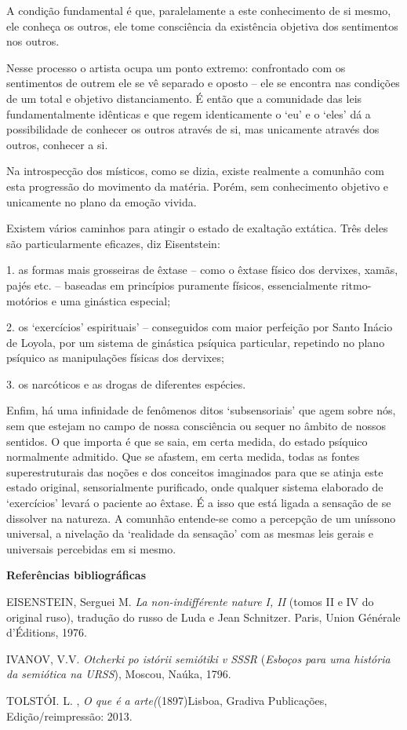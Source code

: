 A condição fundamental é que, paralelamente a este conhecimento de si
mesmo, ele conheça os outros, ele tome consciência da existência
objetiva dos sentimentos nos outros.

Nesse processo o artista ocupa um ponto extremo: confrontado com os
sentimentos de outrem ele se vê separado e oposto -- ele se encontra nas
condições de um total e objetivo distanciamento. É então que a
comunidade das leis fundamentalmente idênticas e que regem identicamente
o `eu' e o `eles' dá a possibilidade de conhecer os outros através de
si, mas unicamente através dos outros, conhecer a si.

Na introspecção dos místicos, como se dizia, existe realmente a comunhão
com esta progressão do movimento da matéria. Porém, sem conhecimento
objetivo e unicamente no plano da emoção vivida.

Existem vários caminhos para atingir o estado de exaltação extática.
Três deles são particularmente eficazes, diz Eisentstein:

1. as formas mais grosseiras de êxtase -- como o êxtase físico dos
dervixes, xamãs, pajés etc. -- baseadas em princípios puramente físicos,
essencialmente ritmo-motórios e uma ginástica especial;

2. os `exercícios' espirituais' -- conseguidos com maior perfeição por
Santo Inácio de Loyola, por um sistema de ginástica psíquica particular,
repetindo no plano psíquico as manipulações físicas dos dervixes;

3. os narcóticos e as drogas de diferentes espécies.

Enfim, há uma infinidade de fenômenos ditos `subsensoriais' que agem
sobre nós, sem que estejam no campo de nossa consciência ou sequer no
âmbito de nossos sentidos. O que importa é que se saia, em certa medida,
do estado psíquico normalmente admitido. Que se afastem, em certa
medida, todas as fontes superestruturais das noções e dos conceitos
imaginados para que se atinja este estado original, sensorialmente
purificado, onde qualquer sistema elaborado de `exercícios' levará o
paciente ao êxtase. É a isso que está ligada a sensação de se dissolver
na natureza. A comunhão entende-se como a percepção de um uníssono
universal, a nivelação da `realidade da sensação' com as mesmas leis
gerais e universais percebidas em si mesmo.

\textbf{Referências bibliográficas}

EISENSTEIN, Serguei M. \emph{La non-indifférente nature I, II} (tomos II
e IV do original ruso), tradução do russo de Luda e Jean Schnitzer.
Paris, Union Générale d'Éditions, 1976.

IVANOV, V.V. \emph{Otcherki po istórii semiótiki v SSSR} (\emph{Esboços
para uma história da semiótica na URSS}), Moscou, Naúka, 1796.

TOLSTÓI. L. , \emph{O que é a arte(}(1897)Lisboa, Gradiva Publicações,
Edição/reimpressão: 2013.
